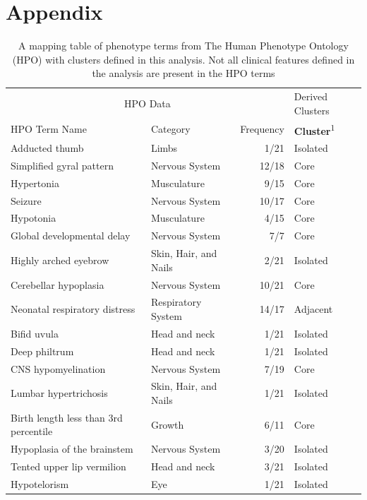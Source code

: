 \documentclass[
  authoryear,
  preprint,
  3p]{elsarticle}
\begin{document}
\newpage

\hypertarget{appendix}{%
\section{Appendix}\label{appendix}}

\hypertarget{tbl-hpo}{}
\setlength{\LTpost}{0mm}
\begin{longtable}{llrl}
\caption{\label{tbl-hpo}A mapping table of phenotype terms from The Human Phenotype Ontology
(HPO) with clusters defined in this analysis. Not all clinical features
defined in the analysis are present in the HPO terms }\tabularnewline

\toprule
\multicolumn{3}{c}{HPO Data} & Derived Clusters \\ 
\cmidrule(lr){1-3} \cmidrule(lr){4-4}
HPO Term Name & Category & Frequency & \textbf{Cluster}\textsuperscript{1} \\ 
\midrule
Adducted thumb & Limbs & 1/21 & Isolated \\ 
Simplified gyral pattern & Nervous System & 12/18 & Core \\ 
Hypertonia & Musculature & 9/15 & Core \\ 
Seizure & Nervous System & 10/17 & Core \\ 
Hypotonia & Musculature & 4/15 & Core \\ 
Global developmental delay & Nervous System & 7/7 & Core \\ 
Highly arched eyebrow & Skin, Hair, and Nails & 2/21 & Isolated \\ 
Cerebellar hypoplasia & Nervous System & 10/21 & Core \\ 
Neonatal respiratory distress & Respiratory System & 14/17 & Adjacent \\ 
Bifid uvula & Head and neck & 1/21 & Isolated \\ 
Deep philtrum & Head and neck & 1/21 & Isolated \\ 
CNS hypomyelination & Nervous System & 7/19 & Core \\ 
Lumbar hypertrichosis & Skin, Hair, and Nails & 1/21 & Isolated \\ 
Birth length less than 3rd percentile & Growth & 6/11 & Core \\ 
Hypoplasia of the brainstem & Nervous System & 3/20 & Isolated \\ 
Tented upper lip vermilion & Head and neck & 3/21 & Isolated \\ 
Hypotelorism & Eye & 1/21 & Isolated \\ 

\end{longtable}
\end{document}
